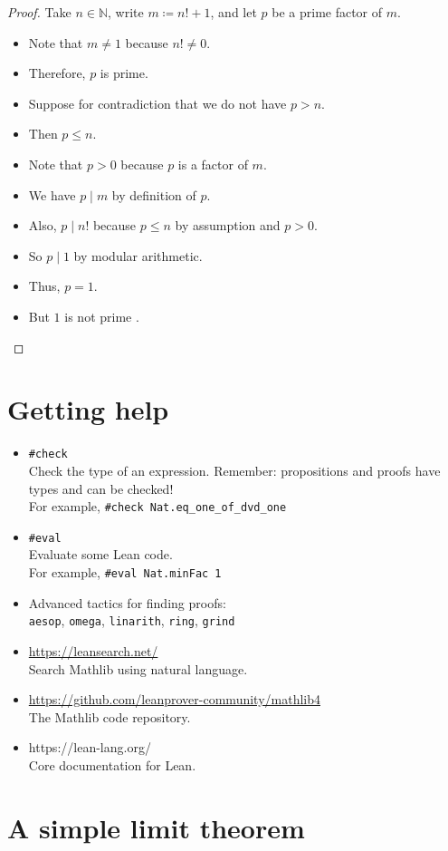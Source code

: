 \documentclass[12pt]{article}
\newcommand{\N}{\mathbb{N}}
\begin{document}
\begin{proof}
  Take $n \in \N$, write $m \coloneqq n! + 1$,
  and let $p$ be a prime factor of $m$.
  \begin{itemize}
    \item Note that $m \neq 1$ because $n! \neq 0$.
    \item Therefore, $p$ is prime.
    \item Suppose for contradiction that we do not have $p > n$.
    \item Then $p \leq n$.
    \item Note that $p > 0$ because $p$ is a factor of $m$.
    \item We have $p \mid m$ by definition of $p$.
    \item Also, $p \mid n!$ because $p \leq n$ by assumption and $p > 0$.
    \item So $p \mid 1$ by modular arithmetic.
    \item Thus, $p = 1$.
    \item But $1$ is not prime \textreferencemark.
      \qedhere
  \end{itemize}
\end{proof}

\pagebreak

\section{Getting help}

\begin{itemize}
  \item \texttt{\#check} \\
    Check the type of an expression.
    Remember: propositions and proofs have types
    and can be checked! \\
    For example, \texttt{\#check Nat.eq\_one\_of\_dvd\_one}
  \item \texttt{\#eval} \\
    Evaluate some Lean code. \\
    For example, \texttt{\#eval Nat.minFac 1}
  \item Advanced tactics for finding proofs: \\
    \texttt{aesop}, \texttt{omega}, \texttt{linarith},
    \texttt{ring}, \texttt{grind}
  \item \url{https://leansearch.net/} \\
    Search Mathlib using natural language.
  \item \url{https://github.com/leanprover-community/mathlib4} \\
    The Mathlib code repository.
  \item https://lean-lang.org/ \\
    Core documentation for Lean.
\end{itemize}

\pagebreak

\section{A simple limit theorem}
\end{document}
